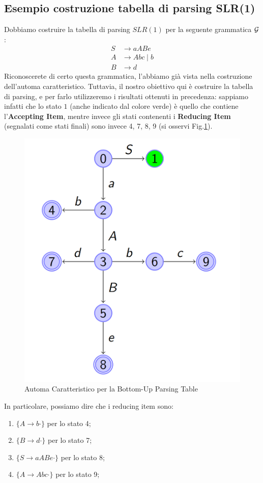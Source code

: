 \documentclass[class=book, crop=false, oneside, 12pt]{standalone}
\begin{document}
\subsection{Esempio costruzione tabella di parsing SLR(1)}
Dobbiamo costruire la tabella di parsing \(SLR(1)\) per la seguente grammatica \(\mathcal{G}\):
\begin{align*}
    S &\rightarrow aABe \\
    A &\rightarrow Abc \mid b \\
    B &\rightarrow d
\end{align*}
Riconoscerete di certo questa grammatica, l'abbiamo già vista nella costruzione dell'automa caratteristico. Tuttavia, il nostro obiettivo qui è costruire la tabella di parsing, e per farlo utilizzeremo i risultati ottenuti in precedenza: sappiamo infatti che lo stato \(1\) (anche indicato dal colore verde) è quello che contiene l'\textbf{Accepting Item}, mentre invece gli stati contenenti i \textbf{Reducing Item} (segnalati come stati finali) sono invece 4, 7, 8, 9 (si osservi Fig.\ref{fig:charateristic-automata-complete}). 
\begin{figure}
    \centering
    \includegraphics[width=.8\textwidth]{charateristic-automata-complete.png}
    \caption{Automa Caratteristico per la Bottom-Up Parsing Table}
    \label{fig:charateristic-automata-complete}    
\end{figure}
In particolare, possiamo dire che i reducing item sono:
\begin{enumerate}
    \item \(\{A \rightarrow b \cdot\}\) per lo stato 4;
    \item \(\{B \rightarrow d \cdot\}\) per lo stato 7;
    \item \(\{S \rightarrow aABe \cdot\}\) per lo stato 8;
    \item \(\{A \rightarrow Abc \cdot\}\) per lo stato 9;
\end{enumerate}
\end{document}
